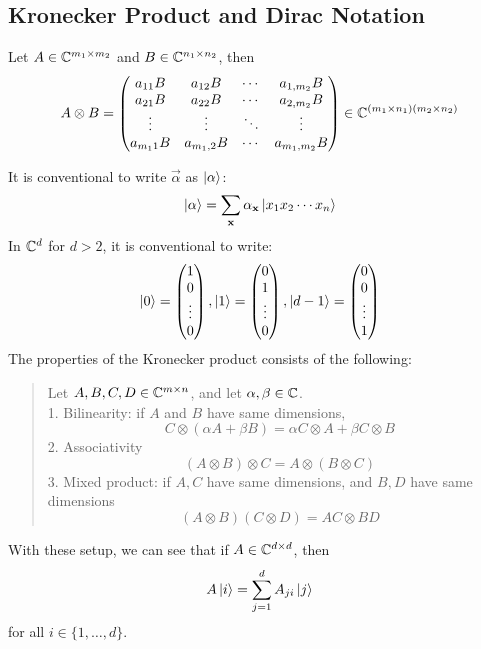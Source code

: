 \subsection{Kronecker Product and Dirac Notation}
\begin{definition}
    Let $A \in \mathbb{C}^{m_1 \times m_2}$ and $B \in \mathbb{C}^{n_1 \times n_2}$, then
    $$A \otimes B = \begin{pmatrix}
        a_{11}B & a_{12}B & \cdots & a_{1,m_2}B \\
        a_{21}B & a_{22}B & \cdots & a_{2,m_2}B \\
        \vdots & \vdots & \ddots & \vdots \\
        a_{m_11}B & a_{m_1, 2}B & \cdots & a_{m_1,m_2}B
    \end{pmatrix} \in \mathbb{C}^{(m_1 \times n_1)(m_2 \times n_2)}$$
\end{definition}
It is conventional to write $\vec{\alpha}$ as $\ket{\alpha}$:
$$\ket{\alpha} = \sum_{\mathbf{x}} \alpha_{\mathbf{x}} \ket{x_1 x_2 \cdots x_n}$$
In $\mathbb{C}^d$ for $d > 2$, it is conventional to write:
$$\ket{0} = \begin{pmatrix}
    1 \\ 0 \\ \vdots \\ 0
\end{pmatrix}, \ket{1} = \begin{pmatrix}
    0 \\ 1 \\ \vdots \\ 0
\end{pmatrix}, \ket{d - 1} = \begin{pmatrix}
    0 \\ 0 \\ \vdots \\ 1
\end{pmatrix}$$
The properties of the Kronecker product consists of the following:
\begin{quote}
    Let $A, B, C, D \in \mathbb{C}^{m \times n}$, and let $\alpha, \beta \in \mathbb{C}$. \\
    1. Bilinearity: if $A$ and $B$ have same dimensions, $$C \otimes (\alpha A + \beta B) = \alpha C \otimes A + \beta C \otimes B$$
    2. Associativity $$(A \otimes B) \otimes C = A \otimes (B \otimes C)$$
    3. Mixed product: if $A, C$ have same dimensions, and $B, D$ have same dimensions
    $$(A \otimes B)(C \otimes D) = AC \otimes BD$$
\end{quote}
With these setup, we can see that if $A \in \mathbb{C}^{d \times d}$, then
$$A \ket{i} = \sum_{j = 1}^{d} A_{ji} \ket{j}$$
for all $i \in \{1, \dots, d\}$.

